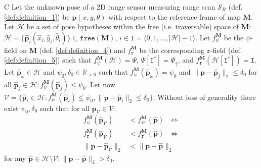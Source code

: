 \begin{customcnj}{C}
  \label{cnj:conjecture_c}
  Let the unknown pose of a 2D range sensor measuring range scan $\mathcal{S}_R$
  (def. \ref{def:definition_1}) be $\bm{p}(x,y,\theta)$ with respect to the
  reference frame of map $\bm{M}$.
  Let $\mathcal{H}$ be a set of pose hypotheses within the free (i.e.
  traversable) space of $\bm{M}$:
  $\mathcal{H} = \{\hat{\bm{p}}_i(\hat{x}_i,\hat{y}_i,\hat{\theta}_i)\} \subseteq \texttt{free}(\bm{M})$,
  $i \in \texttt{I} = \langle 0,1,\dots,|\mathcal{H}|-1\rangle$.
  Let $f_{\psi}^{\bm{M}}$ be the $\psi$-field on $\bm{M}$
  (def. \ref{def:definition_4}) and
  $f_{\texttt{r}}^{\bm{M}}$ be the corresponding $\texttt{r}$-field
  (def. \ref{def:definition_5}) such that
  $f_{\psi}^{\bm{M}}(\mathcal{H})= \Psi$,
  $\Psi[\texttt{I}^{\ast}] = \Psi_\uparrow$,
  and
  $f_{\texttt{r}}^{\bm{M}}(\mathcal{H}[\texttt{I}^{\ast}]) = \texttt{I}$.
  Let $\hat{\bm{p}}_\omega \in \mathcal{H}$ and $\psi_0,\delta_0 \in \mathbb{R}_{>0}$
  such that $f_{\psi}^{\bm{M}}(\hat{\bm{p}}_\omega ) = \psi_0$ and
  $\|\bm{p}-\hat{\bm{p}}_j\|_2 \leq \delta_0$ for all
  $\hat{\bm{p}}_j \in \mathcal{H}: f_{\psi}^{\bm{M}}(\hat{\bm{p}}_j) \leq \psi_0$.
  Let now $\mathcal{V} = \{\hat{\bm{p}}_i \in \mathcal{H}: f_{\psi}^{\bm{M}}(\hat{\bm{p}}_i) \leq \psi_0,
  \|\bm{p}-\hat{\bm{p}}_i\|_2 \leq \delta_0\}$.
  Without loss of generality there exist $\psi_0,\delta_0$ such that for all
  $\hat{\bm{p}}_\mathcal{V} \in \mathcal{V}$:
  \begin{align}
    f_{\psi}^{\bm{M}}(\hat{\bm{p}}_\mathcal{V}) &< f_{\psi}^{\bm{M}}(\hat{\bm{p}}) \ \ \ \Leftrightarrow \nonumber \\
    f_{\texttt{r}}^{\bm{M}}(\hat{\bm{p}}_\mathcal{V}) &< f_{\texttt{r}}^{\bm{M}}(\hat{\bm{p}}) \ \ \ \Leftrightarrow \nonumber \\
    \|\bm{p}-\hat{\bm{p}}_\mathcal{V}\|_2 &< \|\bm{p}-\hat{\bm{p}}_{}\|_2 \nonumber
  \end{align}
  for any $\hat{\bm{p}}_{} \in {\mathcal{H} \setminus  \mathcal{V}}: \|\bm{p}-\hat{\bm{p}}_{}\|_2 > \delta_0$.
\end{customcnj}



